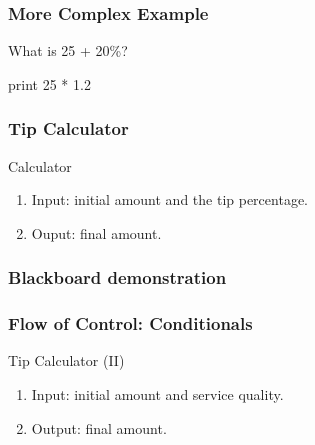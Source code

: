 \begin{frame}[fragile]
\frametitle{More Complex Example}

What is 25 + 20\%?

\pause
\begin{python}
print 25 * 1.2
\end{python}
\end{frame}

\begin{frame}[fragile]
\frametitle{Tip Calculator}

\begin{block}{Calculator}
\begin{enumerate}
\item Input: initial amount and the tip percentage.
\item Ouput: final amount.
\end{enumerate}
\end{block}
\end{frame}

\begin{frame}[fragile]
\frametitle{Blackboard demonstration}

\end{frame}

\begin{frame}[fragile]
\frametitle{Flow of Control: Conditionals}

\begin{block}{Tip Calculator (II)}
\begin{enumerate}
\item Input: initial amount and service quality.
\item Output: final amount.
\end{enumerate}
\end{block}


\end{frame}

